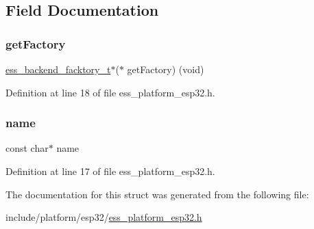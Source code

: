 \subsection{Field Documentation}
\mbox{\label{structess__backends__entry_a86f760dbdba11d491bc8209327d7e514}} 
\subsubsection{\texorpdfstring{get\+Factory}{getFactory}}
{\footnotesize\ttfamily \hyperlink{ess__backend_8h_ab1487f8c501b38b66796d0fbecb7ed7b}{ess\+\_\+backend\+\_\+facktory\+\_\+t}$\ast$($\ast$  get\+Factory) (void)}



Definition at line 18 of file ess\+\_\+platform\+\_\+esp32.\+h.

\mbox{\label{structess__backends__entry_a8f8f80d37794cde9472343e4487ba3eb}} 
\subsubsection{\texorpdfstring{name}{name}}
{\footnotesize\ttfamily const char$\ast$ name}



Definition at line 17 of file ess\+\_\+platform\+\_\+esp32.\+h.



The documentation for this struct was generated from the following file\+:\begin{DoxyCompactItemize}
\item 
include/platform/esp32/\hyperlink{ess__platform__esp32_8h}{ess\+\_\+platform\+\_\+esp32.\+h}\end{DoxyCompactItemize}
